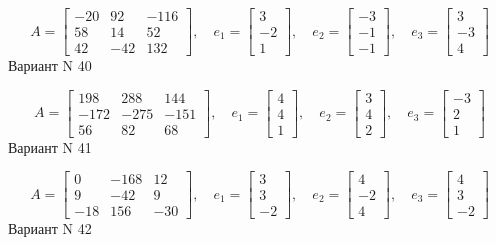 \documentclass[11pt]{report}
\begin{document}
$$A = \left[\begin{matrix}-20 & 92 & -116\\58 & 14 & 52\\42 & -42 & 132\end{matrix}\right],\quad e_1 = \left[\begin{matrix}3\\-2\\1\end{matrix}\right],\quad e_2 = \left[\begin{matrix}-3\\-1\\-1\end{matrix}\right],\quad e_3 = \left[\begin{matrix}3\\-3\\4\end{matrix}\right]$$Вариант N 40

$$A = \left[\begin{matrix}198 & 288 & 144\\-172 & -275 & -151\\56 & 82 & 68\end{matrix}\right],\quad e_1 = \left[\begin{matrix}4\\4\\1\end{matrix}\right],\quad e_2 = \left[\begin{matrix}3\\4\\2\end{matrix}\right],\quad e_3 = \left[\begin{matrix}-3\\2\\1\end{matrix}\right]$$Вариант N 41

$$A = \left[\begin{matrix}0 & -168 & 12\\9 & -42 & 9\\-18 & 156 & -30\end{matrix}\right],\quad e_1 = \left[\begin{matrix}3\\3\\-2\end{matrix}\right],\quad e_2 = \left[\begin{matrix}4\\-2\\4\end{matrix}\right],\quad e_3 = \left[\begin{matrix}4\\3\\-2\end{matrix}\right]$$Вариант N 42
\end{document}

